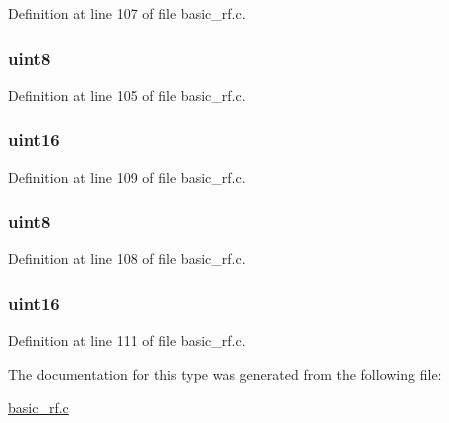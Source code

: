 Definition at line 107 of file basic\_\-rf.c.

\hypertarget{typebasic_rf_pkt_hdr__t_aea43c412b521dcfc686f59bd2eb7110d}{
\subsubsection[{packetLength}]{ {\bfseries uint8 } }}
\label{typebasic_rf_pkt_hdr__t_aea43c412b521dcfc686f59bd2eb7110d}


Definition at line 105 of file basic\_\-rf.c.

\hypertarget{typebasic_rf_pkt_hdr__t_a50930cc6b209d3f2b142839dcfcd1f5f}{
\subsubsection[{panId}]{ {\bfseries uint16 } }}
\label{typebasic_rf_pkt_hdr__t_a50930cc6b209d3f2b142839dcfcd1f5f}


Definition at line 109 of file basic\_\-rf.c.

\hypertarget{typebasic_rf_pkt_hdr__t_afc25a1ae66f46cc1475e43591acbc18b}{
\subsubsection[{seqNumber}]{ {\bfseries uint8 } }}
\label{typebasic_rf_pkt_hdr__t_afc25a1ae66f46cc1475e43591acbc18b}


Definition at line 108 of file basic\_\-rf.c.

\hypertarget{typebasic_rf_pkt_hdr__t_af48612ab72df97fb9d6010c4c36841d0}{
\subsubsection[{srcAddr}]{ {\bfseries uint16 } }}
\label{typebasic_rf_pkt_hdr__t_af48612ab72df97fb9d6010c4c36841d0}


Definition at line 111 of file basic\_\-rf.c.



The documentation for this type was generated from the following file:\begin{DoxyCompactItemize}
\item 
\hyperlink{basic__rf_8c}{basic\_\-rf.c}\end{DoxyCompactItemize}
